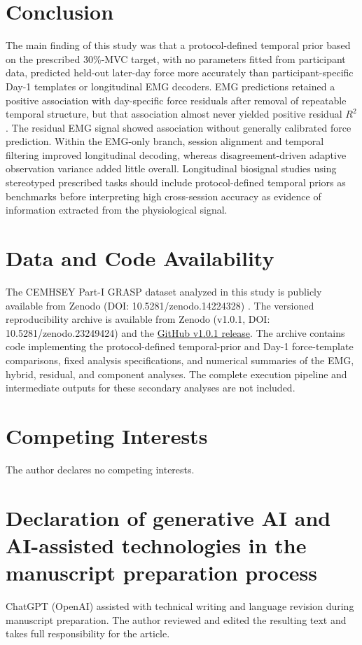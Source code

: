 \documentclass[preprint,12pt]{elsarticle}
\begin{document}
\section{Conclusion}

The main finding of this study was that a protocol-defined temporal prior based on the prescribed 30\%-MVC target, with no parameters fitted from participant data, predicted held-out later-day force more accurately than participant-specific Day-1 templates or longitudinal EMG decoders. EMG predictions retained a positive association with day-specific force residuals after removal of repeatable temporal structure, but that association almost never yielded positive residual $R^2$. The residual EMG signal showed association without generally calibrated force prediction. Within the EMG-only branch, session alignment and temporal filtering improved longitudinal decoding, whereas disagreement-driven adaptive observation variance added little overall. Longitudinal biosignal studies using stereotyped prescribed tasks should include protocol-defined temporal priors as benchmarks before interpreting high cross-session accuracy as evidence of information extracted from the physiological signal.

\section*{Data and Code Availability}
The CEMHSEY Part-I GRASP dataset analyzed in this study is publicly available from Zenodo (DOI: 10.5281/zenodo.14224328) \cite{Yang2025}. The versioned reproducibility archive is available from Zenodo (v1.0.1, DOI: \mbox{10.5281/zenodo.23249424}) and the \href{https://github.com/squareshorts/emg-longitudinal-temporal-prior/releases/tag/v1.0.1}{GitHub v1.0.1 release}. The archive contains code implementing the protocol-defined temporal-prior and Day-1 force-template comparisons, fixed analysis specifications, and numerical summaries of the EMG, hybrid, residual, and component analyses. The complete execution pipeline and intermediate outputs for these secondary analyses are not included.

\section*{Competing Interests}
The author declares no competing interests.

\section*{Declaration of generative AI and AI-assisted technologies in the manuscript preparation process}
ChatGPT (\mbox{OpenAI}) assisted with technical writing and language revision during manuscript preparation. The author reviewed and edited the resulting text and takes full responsibility for the article.



\end{document}
